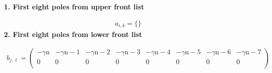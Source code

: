 \documentclass[11pt]{article}
\begin{document}
\noindent\textbf{1. First eight poles from upper front list}

\begin{align*}
  a_{i,k} = 
  \{\}
\end{align*}
\noindent\textbf{2. First eight poles from lower front list}

\begin{align*}
  b_{j,\ell} = 
  \left(
\begin{array}{cccccccc}
 -\text{$\gamma $n} & -\text{$\gamma $n}-1 & -\text{$\gamma $n}-2 & -\text{$\gamma $n}-3 & -\text{$\gamma $n}-4 & -\text{$\gamma $n}-5 & -\text{$\gamma $n}-6 & -\text{$\gamma $n}-7 \\
 0 & 0 & 0 & 0 & 0 & 0 & 0 & 0 \\
\end{array}
\right)
\end{align*}

\printbibliography[title={References}]
\end{document}
